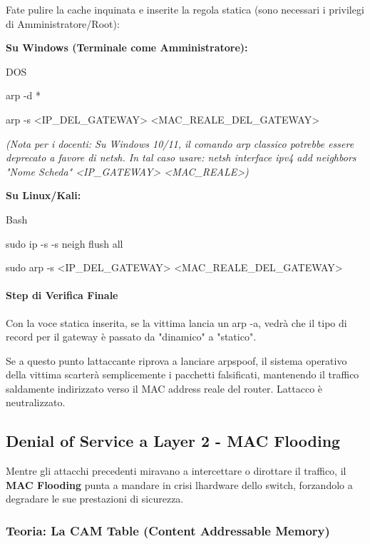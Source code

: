 \documentclass[11pt,a4paper]{article}
\begin{document}
Fate pulire la cache inquinata e inserite la regola statica (sono
necessari i privilegi di Amministratore/Root):

\textbf{Su Windows (Terminale come Amministratore):}

DOS

arp -d *

arp -s \textless IP\_DEL\_GATEWAY\textgreater{}
\textless MAC\_REALE\_DEL\_GATEWAY\textgreater{}

\emph{(Nota per i docenti: Su Windows 10/11, il comando arp classico
potrebbe essere deprecato a favore di netsh. In tal caso usare: netsh
interface ipv4 add neighbors "Nome Scheda"
\textless IP\_GATEWAY\textgreater{} \textless MAC\_REALE\textgreater)}

\textbf{Su Linux/Kali:}

Bash

sudo ip -s -s neigh flush all

sudo arp -s \textless IP\_DEL\_GATEWAY\textgreater{}
\textless MAC\_REALE\_DEL\_GATEWAY\textgreater{}

\paragraph{Step di Verifica Finale}\label{step-di-verifica-finale}

Con la voce statica inserita, se la vittima lancia un arp -a, vedrà che
il tipo di record per il gateway è passato da "dinamico" a "statico".

Se a questo punto l\textquotesingle attaccante riprova a lanciare
arpspoof, il sistema operativo della vittima scarterà semplicemente i
pacchetti falsificati, mantenendo il traffico saldamente indirizzato
verso il MAC address reale del router. L\textquotesingle attacco è
neutralizzato.

\subsection{Denial of Service a Layer 2 - MAC
Flooding}\label{denial-of-service-a-layer-2---mac-flooding}

Mentre gli attacchi precedenti miravano a intercettare o dirottare il
traffico, il \textbf{MAC Flooding} punta a mandare in crisi
l\textquotesingle hardware dello switch, forzandolo a degradare le sue
prestazioni di sicurezza.

\subsubsection{Teoria: La CAM Table (Content Addressable
Memory)}\label{teoria-la-cam-table-content-addressable-memory}
\end{document}
